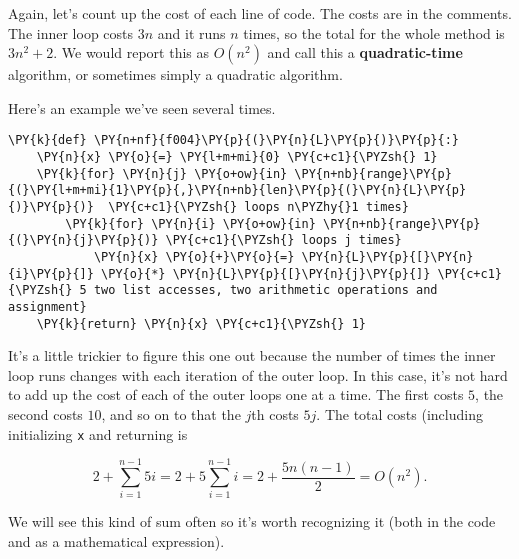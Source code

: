 Again, let's count up the cost of each line of code.
The costs are in the comments.
The inner loop costs $3n$ and it runs $n$ times, so the total for the whole method is $3n^2 + 2$.
We would report this as $O(n^2)$ and call this a \textbf{quadratic-time} algorithm, or sometimes simply a quadratic algorithm.


Here's an example we've seen several times.

\begin{Verbatim}[commandchars=\\\{\}]
\PY{k}{def} \PY{n+nf}{f004}\PY{p}{(}\PY{n}{L}\PY{p}{)}\PY{p}{:}
    \PY{n}{x} \PY{o}{=} \PY{l+m+mi}{0} \PY{c+c1}{\PYZsh{} 1}
    \PY{k}{for} \PY{n}{j} \PY{o+ow}{in} \PY{n+nb}{range}\PY{p}{(}\PY{l+m+mi}{1}\PY{p}{,}\PY{n+nb}{len}\PY{p}{(}\PY{n}{L}\PY{p}{)}\PY{p}{)}  \PY{c+c1}{\PYZsh{} loops n\PYZhy{}1 times}
        \PY{k}{for} \PY{n}{i} \PY{o+ow}{in} \PY{n+nb}{range}\PY{p}{(}\PY{n}{j}\PY{p}{)} \PY{c+c1}{\PYZsh{} loops j times}
            \PY{n}{x} \PY{o}{+}\PY{o}{=} \PY{n}{L}\PY{p}{[}\PY{n}{i}\PY{p}{]} \PY{o}{*} \PY{n}{L}\PY{p}{[}\PY{n}{j}\PY{p}{]} \PY{c+c1}{\PYZsh{} 5 two list accesses, two arithmetic operations and assignment}
    \PY{k}{return} \PY{n}{x} \PY{c+c1}{\PYZsh{} 1}
\end{Verbatim}



It's a little trickier to figure this one out because the number of times the inner loop runs changes with each iteration of the outer loop.
In this case, it's not hard to add up the cost of each of the outer loops one at a time.
The first costs $5$, the second costs $10$, and so on to that the $j$th costs $5j$.
The total costs (including initializing \texttt{x} and returning is


\[
2 + \sum_{i=1}^{n-1}5i = 2 + 5\sum_{i=1}^{n-1}i = 2 + \frac{5n(n-1)}{2} = O(n^2).
\]


We will see this kind of sum often so it's worth recognizing it (both in the code and as a mathematical expression).
